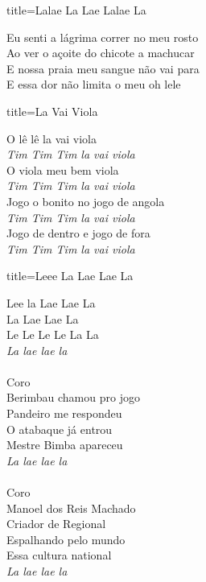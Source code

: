 \documentclass[fontsize=14pt, paper=a4, twoside, DIV=20]{scrreprt} %
\begin{document}
\begin{multicols*}{2}
\begin{song}{title={Lalae La Lae Lalae La}}
{\begin{verse*}
            Eu senti a lágrima correr no meu rosto \\
            Ao ver o açoite do chicote a machucar \\
            E nossa praia meu sangue não vai para \\
            E essa dor não limita o meu oh lele \\
    \end{verse*}}
\end{song}

\begin{song}{title={La Vai Viola}}
    \begin{verse*}
        O lê lê la vai viola\\
        \textit{Tim Tim Tim la vai viola}\\
        O viola meu bem viola\\
        \textit{Tim Tim Tim la vai viola}\\
        Jogo o bonito no jogo de angola\\
        \textit{Tim Tim Tim la vai viola}\\
        Jogo de dentro e jogo de fora\\
        \textit{Tim Tim Tim la vai viola}\\
        \end{verse*}
\end{song}

\begin{song}{title={Leee La Lae Lae La}}
        \begin{verse*}
            Lee la Lae Lae La\\
            La Lae Lae La\\
            Le Le Le Le La La\\
            \textit{La lae lae la}\\
\\
            Coro\\
            Berimbau chamou pro jogo\\
            Pandeiro me respondeu\\
            O atabaque já entrou\\
            Mestre Bimba apareceu\\
            \textit{La lae lae la}\\
\\
            Coro\\
            Manoel dos Reis Machado\\
            Criador de Regional\\
            Espalhando pelo mundo\\
            Essa cultura national\\
            \textit{La lae lae la}\\


\end{verse*}
\end{song}
\end{multicols*}
\end{document}
